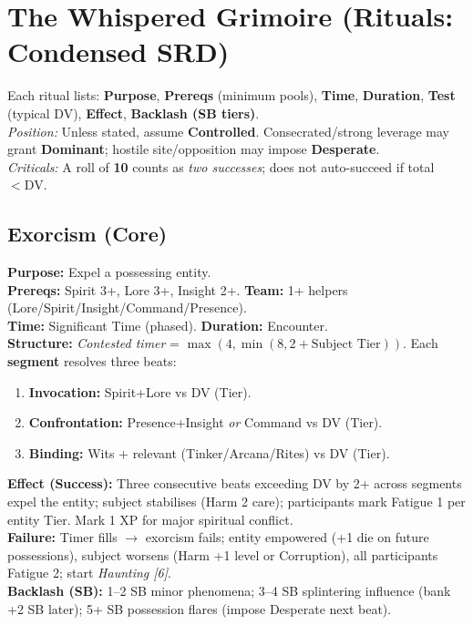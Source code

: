 \newpage
\section{The Whispered Grimoire (Rituals: Condensed SRD)}\label{sec:rituals_condensed}

\begin{tcolorbox}[title=Rituals (SRD Format),colback=gray!4,colframe=black!60,breakable]
Each ritual lists: \textbf{Purpose}, \textbf{Prereqs} (minimum pools), \textbf{Time}, \textbf{Duration}, \textbf{Test} (typical DV), \textbf{Effect}, \textbf{Backlash (SB tiers)}.\\
\emph{Position:} Unless stated, assume \textbf{Controlled}. Consecrated/strong leverage may grant \textbf{Dominant}; hostile site/opposition may impose \textbf{Desperate}.\\
\emph{Criticals:} A roll of \textbf{10} counts as \emph{two successes}; does not auto-succeed if total $< \mathrm{DV}$.
\end{tcolorbox}

\subsection*{Exorcism (Core)}
\textbf{Purpose:} Expel a possessing entity. \\
\textbf{Prereqs:} Spirit 3+, Lore 3+, Insight 2+. \quad \textbf{Team:} 1+ helpers (Lore/Spirit/Insight/Command/Presence). \\
\textbf{Time:} Significant Time (phased). \quad \textbf{Duration:} Encounter.\\
\textbf{Structure:} \emph{Contested timer} = \(\max(4,\min(8, 2 + \text{Subject Tier}))\). Each \textbf{segment} resolves three beats:
\begin{enumerate}
    \item \textbf{Invocation:} Spirit+Lore vs DV (Tier).
    \item \textbf{Confrontation:} Presence+Insight \emph{or} Command vs DV (Tier).
    \item \textbf{Binding:} Wits + relevant (Tinker/Arcana/Rites) vs DV (Tier).
\end{enumerate}
\textbf{Effect (Success):} Three consecutive beats exceeding DV by 2+ across segments expel the entity; subject stabilises (Harm 2 care); participants mark Fatigue 1 per entity Tier. Mark 1 XP for major spiritual conflict.\\
\textbf{Failure:} Timer fills $\rightarrow$ exorcism fails; entity empowered (+1 die on future possessions), subject worsens (Harm +1 level or Corruption), all participants Fatigue 2; start \emph{Haunting [6]}.\\
\textbf{Backlash (SB):} 1--2 SB minor phenomena; 3--4 SB splintering influence (bank +2 SB later); 5+ SB possession flares (impose Desperate next beat).

